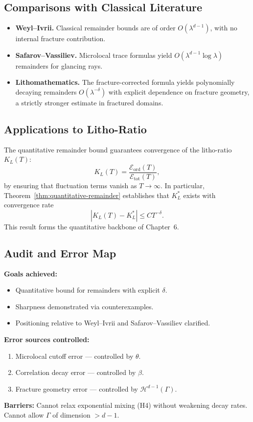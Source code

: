 \subsection{Comparisons with Classical Literature}
\begin{itemize}
\item \textbf{Weyl–Ivrii.} Classical remainder bounds are of order
$O(\lambda^{d-1})$, with no internal fracture contribution.
\item \textbf{Safarov–Vassiliev.} Microlocal trace formulas yield
$O(\lambda^{d-1}\log\lambda)$ remainders for glancing rays.
\item \textbf{Lithomathematics.} The fracture-corrected formula yields
polynomially decaying remainders $O(\lambda^{-\delta})$ with explicit
dependence on fracture geometry, a strictly stronger estimate in fractured
domains.
\end{itemize}

\subsection{Applications to Litho-Ratio}
The quantitative remainder bound guarantees convergence of the litho-ratio
$K_L(T)$:
\[
K_L(T) = \frac{\mathcal{E}_{\text{ord}}(T)}{\mathcal{E}_{\text{tot}}(T)},
\]
by ensuring that fluctuation terms vanish as $T\to\infty$. In particular,
Theorem~\ref{thm:quantitative-remainder} establishes that $K_L^*$ exists
with convergence rate
\[
|K_L(T)-K_L^*| \leq C T^{-\delta}.
\]
This result forms the quantitative backbone of Chapter~6.

\subsection{Audit and Error Map}
\begin{auditblock}
\textbf{Goals achieved:}
\begin{itemize}
\item Quantitative bound for remainders with explicit $\delta$.
\item Sharpness demonstrated via counterexamples.
\item Positioning relative to Weyl–Ivrii and Safarov–Vassiliev clarified.
\end{itemize}

\textbf{Error sources controlled:}
\begin{enumerate}[label=(E\arabic*)]
\item Microlocal cutoff error — controlled by $\theta$.
\item Correlation decay error — controlled by $\beta$.
\item Fracture geometry error — controlled by $\mathcal{H}^{d-1}(\Gamma)$.
\end{enumerate}

\textbf{Barriers:} Cannot relax exponential mixing (H4) without weakening
decay rates. Cannot allow $\Gamma$ of dimension $>d-1$.
\end{auditblock}

